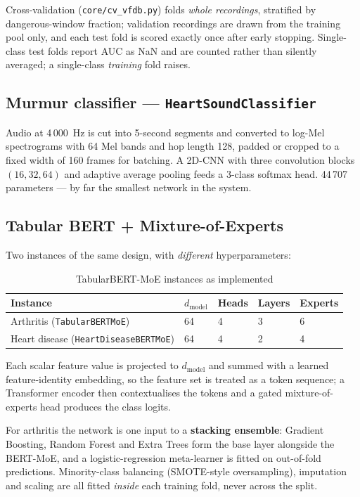 \documentclass[11pt,a4paper]{article}
\newcommand{\code}[1]{\texttt{\small #1}}
\begin{document}
Cross-validation (\code{core/cv\_vfdb.py}) folds \emph{whole recordings},
stratified by dangerous-window fraction; validation recordings are drawn
from the training pool only, and each test fold is scored exactly once
after early stopping. Single-class test folds report AUC as NaN and are
counted rather than silently averaged; a single-class \emph{training} fold
raises.

\subsection{Murmur classifier --- \texorpdfstring{\code{HeartSoundClassifier}}{HeartSoundClassifier}}

Audio at 4\,000~Hz is cut into 5-second segments and converted to log-Mel
spectrograms with 64 Mel bands and hop length 128, padded or cropped to a
fixed width of 160 frames for batching. A 2D-CNN with three convolution
blocks $(16, 32, 64)$ and adaptive average pooling feeds a 3-class softmax
head. 44\,707 parameters --- by far the smallest network in the system.

\subsection{Tabular BERT + Mixture-of-Experts}

Two instances of the same design, with \emph{different} hyperparameters:

\begin{table}[!ht]
\centering
\caption{TabularBERT-MoE instances as implemented}
\label{tab:bertmoe}
\small
\begin{tabular}{@{}p{4.2cm}p{2.2cm}p{2.0cm}p{2.0cm}p{2.2cm}@{}}
\toprule
\textbf{Instance} & \textbf{$d_{\text{model}}$} & \textbf{Heads} &
\textbf{Layers} & \textbf{Experts}\\
\midrule
Arthritis (\code{TabularBERTMoE}) & 64 & 4 & 3 & 6\\
Heart disease (\code{HeartDiseaseBERTMoE}) & 64 & 4 & 2 & 4\\
\bottomrule
\end{tabular}
\end{table}

Each scalar feature value is projected to $d_{\text{model}}$ and summed
with a learned feature-identity embedding, so the feature set is treated
as a token sequence; a Transformer encoder then contextualises the tokens
and a gated mixture-of-experts head produces the class logits.

For arthritis the network is one input to a \textbf{stacking ensemble}:
Gradient Boosting, Random Forest and Extra Trees form the base layer
alongside the BERT-MoE, and a logistic-regression meta-learner is fitted
on out-of-fold predictions. Minority-class balancing (SMOTE-style
oversampling), imputation and scaling are all fitted \emph{inside} each
training fold, never across the split.
\end{document}
